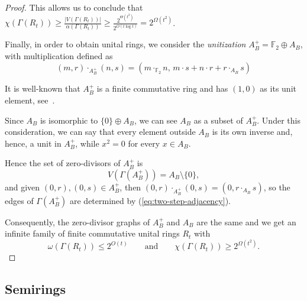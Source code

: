 \documentclass[a4paper,11pt]{amsart}
\theoremstyle{definition}
\newcommand{\F}{\mathbb F}
\begin{document}
\begin{proof}
This allows us to conclude that $\chi(\Gamma(R_t))\geq \frac{|V(\Gamma(R_t))|}{\alpha(\Gamma(R_t))}\geq \frac{2^{\Theta(t^2)}}{2^{O(t\log t)}}=2^{\Omega(t^2)}$.

Finally, in order to obtain unital rings, we consider the \emph{unitization}  $
 A_B^+=\F_2\oplus A_B$, with multiplication defined as \[(m,r)\cdot_{A_B^+}(n,s)=(m\cdot_{\mathbb F_2}n,\,m\cdot s+n\cdot r+r\cdot_{A_B}s)\]

It is well-known that $A_B^+$ is a finite commutative ring and has $(1,0)$ as its unit element, see~\cite[p.~11]{Schafer66}.

Since $A_B$ is isomorphic to $\{0\}\oplus A_B$, we can see $A_B$ as a subset of $A_B^+$. Under this consideration, we can say that every element outside $A_B$ is its own inverse and, hence, a unit in $A_B^+$, while $x^2=0$ for every $x\in A_B$.

Hence the set of  zero-divisors of $A_B^+$ is
\[
 V(\Gamma(A_B^+))=A_B\setminus\{0\},
\]
and given $(0,r),(0,s)\in A_B^+$, then $(0,r)\cdot_{A_B^+}(0,s)=(0,r\cdot_{A_B}s)$, so the edges of $\Gamma(A_B^+)$ are determined by (\ref{eq:two-step-adjacency}).

Consequently, the zero-divisor graphs of $A_B^+$ and $A_B$ are the same and we get an infinite family of finite commutative unital rings $R_t$ with \[ 
\omega(\Gamma(R_t))\leq 2^{O(t)}\qquad \text{and} \qquad \chi(\Gamma(R_t))\geq 2^{\Omega(t^2)}.\] 
\end{proof}


\subsection{Semirings}\label{subsec:semirings}
\end{document}
